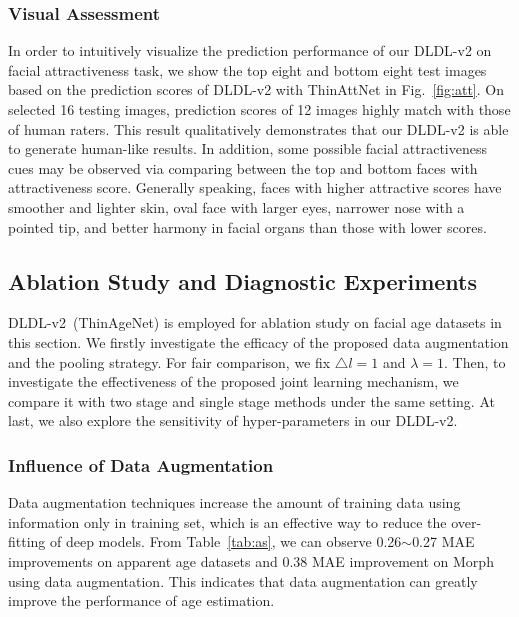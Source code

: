 \documentclass[5p,times,twocolumn]{elsarticle}
\begin{document}
\subsubsection{Visual Assessment}
In order to intuitively visualize the prediction performance of our DLDL-v2 on facial attractiveness task, we show the top eight and bottom eight test images based on the prediction scores of DLDL-v2 with ThinAttNet in Fig.~\ref{fig:att}. On selected 16 testing images, prediction scores of 12 images highly match with those of human raters. This result qualitatively demonstrates that our DLDL-v2 is able to generate human-like results. In addition, some possible facial attractiveness cues may be observed via comparing between the top and bottom faces with attractiveness score. Generally speaking, faces with higher attractive scores have smoother and lighter skin, oval face with larger eyes, narrower nose with a pointed tip, and better harmony in facial organs than those with lower scores.

\subsection{Ablation Study and Diagnostic Experiments}

DLDL-v2~(ThinAgeNet) is employed for ablation study on facial age datasets in this section. We firstly investigate the efficacy of the proposed data augmentation and the pooling strategy. For fair comparison, we fix $\bigtriangleup l =1$ and $\lambda=1$. Then, to investigate the effectiveness of the proposed joint learning mechanism, we compare it with two stage and single stage methods under the same setting. At last, we also explore the sensitivity of hyper-parameters in our DLDL-v2. 

\subsubsection{Influence of Data Augmentation} 
Data augmentation techniques increase the amount of training data using information only in training set, which is an effective way to reduce the over-fitting of deep models. From Table~\ref{tab:as}, we can observe 0.26$\sim$0.27 MAE improvements on apparent age datasets and 0.38 MAE improvement on Morph using data augmentation. This indicates that data augmentation can greatly improve the performance of age estimation.
\end{document}
